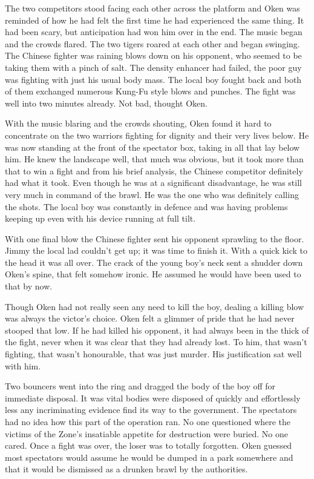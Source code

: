 The two competitors stood facing each other across the platform and Oken was reminded of how he had felt the first time he had experienced the same thing. It had been scary, but anticipation had won him over in the end. The music began and the crowds flared. The two tigers roared at each other and began swinging. The Chinese fighter was raining blows down on his opponent, who seemed to be taking them with a pinch of salt. The density enhancer had failed, the poor guy was fighting with just his usual body mass. The local boy fought back and both of them exchanged numerous Kung-Fu style blows and punches. The fight was well into two minutes already. Not bad, thought Oken.

With the music blaring and the crowds shouting, Oken found it hard to concentrate on the two warriors fighting for dignity and their very lives below. He was now standing at the front of the spectator box, taking in all that lay below him. He knew the landscape well, that much was obvious, but it took more than that to win a fight and from his brief analysis, the Chinese competitor definitely had what it took. Even though he was at a significant disadvantage, he was still very much in command of the brawl. He was the one who was definitely calling the shots. The local boy was constantly in defence and was having problems keeping up even with his device running at full tilt.

With one final blow the Chinese fighter sent his opponent sprawling to the floor. Jimmy the local lad couldn't get up; it was time to finish it. With a quick kick to the head it was all over. The crack of the young boy's neck sent a shudder down Oken's spine, that felt somehow ironic. He assumed he would have been used to that by now.

Though Oken had not really seen any need to kill the boy, dealing a killing blow was always the victor's choice. Oken felt a glimmer of pride that he had never stooped that low. If he had killed his opponent, it had always been in the thick of the fight, never when it was clear that they had already lost. To him, that wasn't fighting, that wasn't honourable, that was just murder. His justification sat well with him.

Two bouncers went into the ring and dragged the body of the boy off for immediate disposal. It was vital bodies were disposed of quickly and effortlessly less any incriminating evidence find its way to the government. The spectators had no idea how this part of the operation ran. No one questioned where the victims of the Zone's insatiable appetite for destruction were buried. No one cared. Once a fight was over, the loser was to totally forgotten. Oken guessed most spectators would assume he would be dumped in a park somewhere and that it would be dismissed as a drunken brawl by the authorities.

